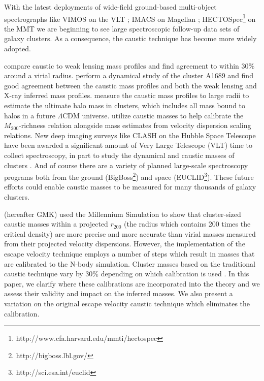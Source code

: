 \documentclass[iop]{emulateapj}
\begin{document}
                
        With the latest deployments of wide-field ground-based multi-object spectrographs like VIMOS on the VLT \citep{LeFevre03}; IMACS on Magellan \citep{Dressler11}; HECTOSpec\footnote{http://www.cfa.harvard.edu/mmti/hectospec} on the MMT we are beginning to see large spectroscopic follow-up data sets of galaxy clusters. As a consequence, the caustic technique has become more widely adopted. 
        
        \citet{Geller13} compare caustic to weak lensing mass profiles and find agreement to within $30\%$ around a virial radius. \citet{Lemze09} perform a dynamical study of the cluster A1689 and find good agreement between the caustic mass profiles and both the weak lensing and X-ray inferred mass profiles. \citet{Rines12} measure the caustic mass profiles to large radii to estimate the ultimate halo mass in clusters, which includes all mass bound to halos in a future $\Lambda$CDM universe. \citet{Andreon10} utilize caustic masses to help calibrate the $M_{200}$-richness relation alongside mass estimates from velocity dispersion scaling relations. New deep imaging surveys like CLASH on the Hubble Space Telescope have been awarded a significant amount of Very Large Telescope (VLT) time to collect spectroscopy, in part to study the dynamical and caustic masses of clusters \citep{Postman12}. And of course there are a variety of planned large-scale spectroscopy programs both from the ground (BigBoss\footnote{http://bigboss.lbl.gov/}) and space (EUCLID\footnote{http://sci.esa.int/euclid}). These future efforts could enable caustic masses to be measured for many thousands of galaxy clusters.
      
        \citet{Gifford13a}  (hereafter GMK) used the Millennium Simulation \citep{Springel05} to show that cluster-sized caustic masses within a projected  $r_{200}$ (the radius which contains 200 times the critical density) are more precise and more accurate than virial masses measured from their projected velocity dispersions. However, the implementation of the escape velocity technique employs a number of steps which result in masses that are calibrated to the N-body simulation. Cluster masses based on the traditional caustic technique vary by 30\% depending on which calibration is used \citep{Diaferio97,Diaferio99,Serra11}. In this paper, we clarify where these calibrations are incorporated into the theory and we assess their validity and impact on the inferred masses. We also present a variation on the original escape velocity caustic technique which eliminates the calibration.
        
\end{document}
